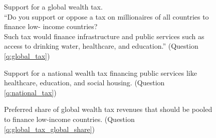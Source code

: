 \documentclass[12pt,english]{article}
\begin{document}
\begin{figure}[h!]
    \caption[Support for a global wealth tax]{Support for a global wealth tax. \\
    ``Do you support or oppose a tax on millionaires of all countries to finance low-
    income countries? \\
    Such tax would finance infrastructure and public services such as access to drinking water, healthcare, and education.'' (Question \ref{q:global_tax})}\label{fig:global_tax}
\end{figure}

\begin{figure}[h!]
    \caption[Support for a national wealth tax]{Support for a national wealth tax financing public services like healthcare, education, and social housing. (Question \ref{q:national_tax})}\label{fig:national_tax}
\end{figure}

\begin{figure}[h!]
    \caption[Preferred share of global tax for low-income countries]{Preferred share of global wealth tax revenues that should be pooled to finance low-income countries. (Question \ref{q:global_tax_global_share})}\label{fig:global_tax_global_share}
\end{figure}
\end{document}
